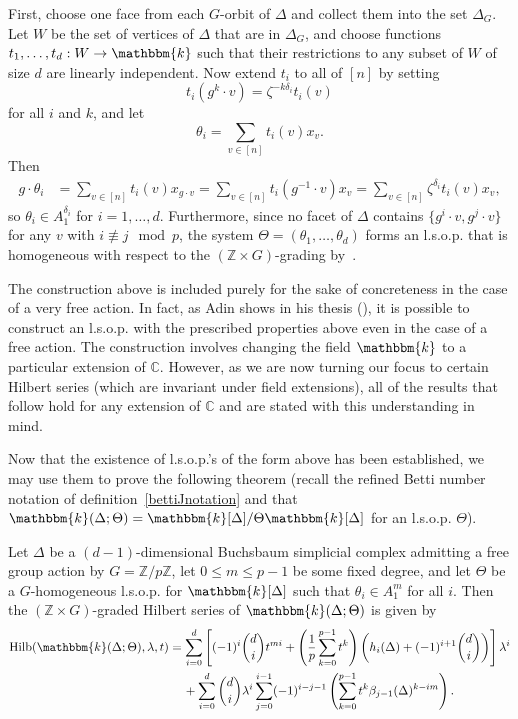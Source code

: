 \documentclass[ALCO,ThmDefs,Unicode]{cedram}
\DeclareMathOperator{\Hilb}{Hilb}
\newcommand{\field}{\mathbbm{k}}
\newcommand{\CC}{{\mathbb C}}
\newcommand{\ZZ}{{\mathbb Z}}
\newcommand*{\MK}{\mkern 2mu}
\begin{document}
First, choose one face from each $G$-orbit of $\Delta$ and collect them into the set $\Delta_G$. Let $W$ be the set of vertices of $\Delta$ that are in $\Delta_G$, and choose functions $t_1, \ldots, t_d:W\to\field$ such that their restrictions to any subset of $W$ of size $d$ are linearly independent. Now extend $t_i$ to all of $[n]$ by setting
\[
t_i(g^k\cdot v)=\zeta^{-k\delta_i}t_i(v)
\]
for all $i$ and $k$, and let
\[
\theta_i=\sum_{v\in [n]}t_i(v)x_v.
\]
Then
\begin{align*}
g\cdot\theta_i &= \sum_{v\in [n]}t_i(v)x_{g\cdot v}=\sum_{v\in [n]}t_i(g^{-1}\cdot v)x_v=\sum_{v\in [n]}\zeta^{\delta_i}t_i(v)x_v,
\end{align*}
so $\theta_i\in A_1^{\delta_i}$ for $i=1, \ldots, d$. Furthermore, since no facet of $\Delta$ contains $\{g^i\cdot v, g^j\cdot v\}$ for any $v$ with $i\not\equiv j \mod p$, the system $\Theta=(\theta_1, \ldots, \theta_d)$ forms an l.s.o.p. that is homogeneous with respect to the $(\ZZ\times G)$-grading by~\cite[Lemma~III.2.4$\MK$(a)]{St-96}.

\begin{rema}\label{freeactionlsop}
The construction above is included purely for the sake of concreteness in the case of a very free action. In fact, as Adin shows in his thesis (\cite{AdinThesis}), it is possible to construct an l.s.o.p. with the prescribed properties above even in the case of a free action. The construction involves changing the field $\field$ to a particular extension of $\CC$. However, as we are now turning our focus to certain Hilbert series (which are invariant under field extensions), all of the results that follow hold for any extension of $\CC$ and are stated with this understanding in mind.
\end{rema}


Now that the existence of l.s.o.p.'s of the form above has been established, we may use them to prove the following theorem (recall the refined Betti number notation of definition~\eqref{bettiJnotation} and that $\field(\Delta; \Theta)=\field[\Delta]/\Theta\field[\Delta]$ for an l.s.o.p. $\Theta$).

\begin{theo}\label{SchenzelAnalog}
Let $\Delta$ be a $(d-1)$-dimensional Buchsbaum simplicial complex admitting a free group action by $G=\ZZ/p\ZZ$, let $0\le m\le p-1$ be some fixed degree, and let $\Theta$ be a $G$-homogeneous l.s.o.p. for $\field[\Delta]$ such that $\theta_i\in A_1^m$ for all $i$. Then the $(\ZZ\times G)$-graded Hilbert series of $\field(\Delta;\Theta)$ is given by
\begin{align*}
\Hilb(\field(\Delta; \Theta), \lambda, t)&=\sum_{i=0}^d\left[(-1)^i\binom{d}{i}t^{mi}+\left(\frac{1}{p}\sum_{k=0}^{p-1}t^k\right)\left(h_i(\Delta)+(-1)^{i+1}\binom{d}{i}\right)\right]\lambda^i\\
&\quad\,+\sum_{i=0}^d\binom{d}{i}\lambda^i\sum_{j=0}^{i-1}(-1)^{i-j-1}\left(\sum_{k=0}^{p-1}t^k\beta_{j-1}(\Delta)^{k-im} \right).
\end{align*}
\end{theo}
\end{document}
